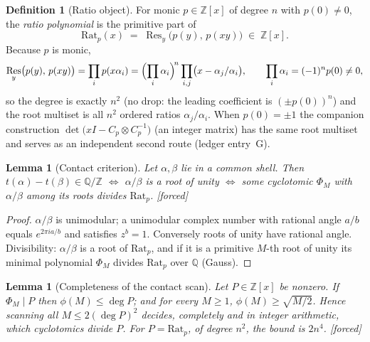 \documentclass[11pt]{article}
\theoremstyle{plain}
\newtheorem{lemma}[theorem]{Lemma}
\theoremstyle{definition}
\newtheorem{definition}[theorem]{Definition}
\theoremstyle{remark}
\newcommand{\Q}{\mathbb{Q}}
\newcommand{\Z}{\mathbb{Z}}
\newcommand{\Rat}{\mathrm{Rat}}
\DeclareMathOperator{\Res}{Res}
\newcommand{\tors}{\Q/\Z}
\newcommand{\F}{\textnormal{[forced]}}
\begin{document}
\begin{definition}[Ratio object]\label{def:rat}
For monic $p\in\Z[x]$ of degree $n$ with $p(0)\neq0$, the \emph{ratio
polynomial} is the primitive part of
\[
\Rat_p(x)\;=\;\Res_y\bigl(p(y),\,p(xy)\bigr)\;\in\;\Z[x].
\]
Because $p$ is monic,
\[
\Res_y\bigl(p(y),\,p(xy)\bigr)=\prod_{i}p(x\alpha_i)
=\Bigl(\prod_i\alpha_i\Bigr)^{\!n}\prod_{i,j}\bigl(x-\alpha_j/\alpha_i\bigr),
\qquad \prod_i\alpha_i=(-1)^n p(0)\neq0,
\]
so the degree is exactly $n^2$ (no drop: the leading coefficient is
$(\pm p(0))^n$) and the root multiset is all $n^2$ ordered ratios
$\alpha_j/\alpha_i$. When $p(0)=\pm1$ the companion construction
$\det\bigl(xI-C_p\otimes C_p^{-1}\bigr)$ (an integer matrix) has the same root
multiset and serves as an independent second route (ledger entry~G).
\end{definition}



\begin{lemma}[Contact criterion]\label{lem:contact}
Let $\alpha,\beta$ lie in a common shell. Then
$t(\alpha)-t(\beta)\in\tors$ $\iff$ $\alpha/\beta$ is a root of unity $\iff$
some cyclotomic $\Phi_M$ with $\alpha/\beta$ among its roots divides $\Rat_p$.
\F
\end{lemma}

\begin{proof}
$\alpha/\beta$ is unimodular; a unimodular complex number with rational angle
$a/b$ equals $e^{2\pi ia/b}$ and satisfies $z^b=1$. Conversely roots of unity
have rational angle. Divisibility: $\alpha/\beta$ is a root of $\Rat_p$, and if
it is a primitive $M$-th root of unity its minimal polynomial $\Phi_M$ divides
$\Rat_p$ over $\Q$ (Gauss).
\end{proof}

\begin{lemma}[Completeness of the contact scan]\label{lem:complete}
Let $P\in\Z[x]$ be nonzero. If $\Phi_M\mid P$ then $\phi(M)\le\deg P$; and
for every $M\ge1$, $\phi(M)\ge\sqrt{M/2}$. Hence scanning all
$M\le2(\deg P)^2$ decides, completely and in integer arithmetic, which
cyclotomics divide $P$. For $P=\Rat_p$, of degree $n^2$, the bound is
$2n^4$. \F
\end{lemma}
\end{document}

